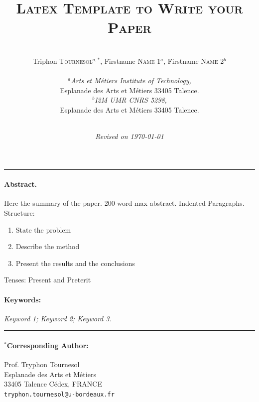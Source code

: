 \documentclass[12pt,a4paper]{article}
\author{\\
Triphon \textsc{Tournesol}$^{a,*}$, Firstname \textsc{Name} 1$^a$, Firstname \textsc{Name} 2$^b$\\ \\
  {\small \textit{$^a$Arts et Métiers Institute of Technology,}}\\
  {\small  Esplanade des Arts et Métiers	 33405 Talence.}\\ 
  {\small  \textit{$^b$I2M UMR CNRS 5298,}}\\
  {\small  Esplanade des Arts et Métiers	 33405 Talence.}\\   \\
   }
\title{{\Large \textsc{Latex Template to Write your Paper}}}
\date{\textit{Revised on \today}}
\renewcommand{\headrulewidth}{0pt}%
\begin{document}
\maketitle
\pagestyle{plain}
\fancyhf{} %
\fancyhead[R]{\leftmark}
\renewcommand{\headrulewidth}{1pt}
\par\noindent\rule{\textwidth}{0.4pt}\vspace{-0.5cm}



\paragraph{Abstract.}

Here the summary of the paper.
200 word max abstract.  Indented Paragraphs. \\
Structure:
\begin{enumerate}
\item	State the problem
\item	Describe the method
\item	Present the results and the conclusions
\end{enumerate}

Tenses: Present and Preterit


\paragraph{Keywords:}
\textit{Keyword 1; Keyword 2; Keyword 3.}


\vspace{-0.2cm}\par\noindent\rule{\textwidth}{0.4pt}

\paragraph{$^*$Corresponding Author:\\}
Prof. Tryphon Tournesol\\
Esplanade des Arts et Métiers\\
33405 Talence Cédex, FRANCE\\
 \texttt{tryphon.tournesol@u-bordeaux.fr}\\
\end{document}
